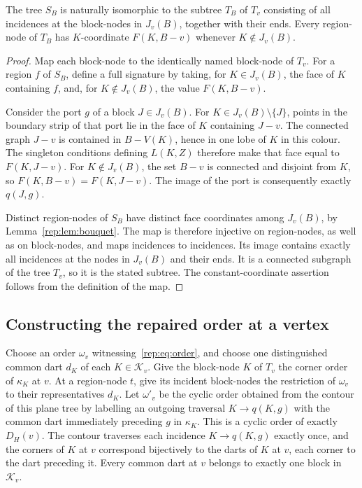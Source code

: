 \begin{lemma}
\label{rep:lem:block-subtree}
The tree $S_B$ is naturally isomorphic to the subtree $T_B$ of $T_v$ consisting
of all incidences at the block-nodes in $J_v(B)$, together with their ends.
Every region-node of $T_B$ has $K$-coordinate $F(K,B-v)$ whenever
$K\notin J_v(B)$.
\end{lemma}

\begin{proof}
Map each block-node to the identically named block-node of $T_v$.  For a
region $f$ of $S_B$, define a full signature by taking, for
$K\in J_v(B)$, the face of $K$ containing $f$, and, for
$K\notin J_v(B)$, the value $F(K,B-v)$.

Consider the port $g$ of a block $J\in J_v(B)$.  For
$K\in J_v(B)\setminus\{J\}$, points in the boundary strip of that port
lie in the face of $K$ containing $J-v$.  The connected graph $J-v$ is
contained in $B-V(K)$, hence in one lobe of $K$ in this colour.  The
singleton conditions defining $L(K,Z)$ therefore make that face equal to
$F(K,J-v)$.  For $K\notin J_v(B)$, the set $B-v$ is connected and disjoint
from $K$, so $F(K,B-v)=F(K,J-v)$.  The image of the port is consequently
exactly $q(J,g)$.

Distinct region-nodes of $S_B$ have distinct face coordinates among
$J_v(B)$, by Lemma~\ref{rep:lem:bouquet}.  The map is therefore injective
on region-nodes, as well as on block-nodes, and maps incidences to
incidences.  Its image contains exactly all incidences at the nodes in
$J_v(B)$ and their ends.  It is a connected subgraph of the tree $T_v$,
so it is the stated subtree.  The constant-coordinate assertion follows
from the definition of the map.
\end{proof}

\subsection{Constructing the repaired order at a vertex}
\label{rep:local-construction}

Choose an order $\omega_v$ witnessing~\eqref{rep:eq:order}, and choose one
distinguished common dart $d_K$ of each $K\in\mathcal K_v$.  Give the
block-node $K$ of $T_v$ the corner order of $\kappa_K$ at $v$.  At a
region-node $t$, give its incident block-nodes the restriction of
$\omega_v$ to their representatives $d_K$.  Let $\omega'_v$ be the cyclic
order obtained from the contour of this plane tree by labelling an outgoing
traversal $K\to q(K,g)$ with the common dart immediately preceding $g$ in
$\kappa_K$.  This is a cyclic order of exactly $D_H(v)$.  The contour
traverses each incidence $K\to q(K,g)$ exactly once, and the corners of $K$
at $v$ correspond bijectively to the darts of $K$ at $v$, each corner to the
dart preceding it.  Every common dart at $v$ belongs to exactly one block
in $\mathcal K_v$.

